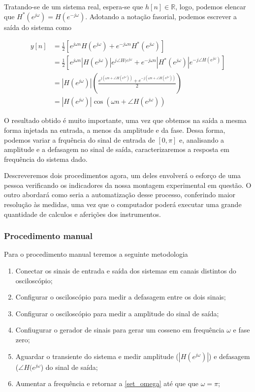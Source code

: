 \documentclass[x11names,a4paper,12pt]{article}
\begin{document}
Tratando-se de um sistema real, espera-se que $h[n] \in \mathbb{R}$, logo, podemos elencar que $H^{*}(e^{j\omega})=H(e^{-j\omega})$. Adotando a notação fasorial, podemos escrever a saída do sistema como

\begin{equation}
  \begin{aligned}
    y[n] & = \frac{1}{2} \left[ e^{j\omega n} H(e^{j\omega}) + e^{-j\omega n} H^*(e^{j\omega}) \right] \\
         & = \frac{1}{2} \left[ e^{j\omega n}|H(e^{j\omega})|e^{j\angle H(e^{j\omega}} + e^{-j\omega n} |H^*(e^{j\omega})|e^{-j\angle H(e^{j\omega})} \right] \\
         & = |H(e^{j\omega})| \left( \frac{e^{j(\omega n + \angle H(e^{j\omega}))} + e^{-j(\omega n + \angle H(e^{j\omega}))}}{2} \right) \\
         & = |H(e^{j\omega})| \cos{(\omega n + \angle H(e^{j\omega}))}
  \end{aligned}
\end{equation}

O resultado obtido é muito importante, uma vez que obtemos na saída a mesma forma injetada na entrada, a menos da amplitude e da fase. Dessa forma, podemos variar a frquência do sinal de entrada de $[0,\pi]$ e, analisando a amplitude e a defasagem no sinal de saída, caracterizaremos a resposta em frequência do sistema dado.

Descreveremos dois procedimentos agora, um deles envolverá o esforço de uma pessoa verificando os indicadores da nossa montagem experimental em questão. O outro abordará como seria a automatização desse processo, conferindo maior resolução às medidas, uma vez que o computador poderá executar uma grande quantidade de calculos e aferições dos instrumentos.

\subsubsection{Procedimento manual}\label{sssec:manual_procedure}

Para o procedimento manual teremos a seguinte metodologia

\begin{enumerate}
  \item Conectar os sinais de entrada e saída dos sistemas em canais distintos do osciloscópio;
  \item Configurar o osciloscópio para medir a defasagem entre os dois sinais;
  \item Configurar o osciloscópio para medir a amplitude do sinal de saída;
  \item Confiugurar o gerador de sinais para gerar um cosseno em frequência $\omega$ e fase zero; \label{set_omega}
  \item Aguardar o transiente do sistema e medir amplitude ($|H(e^{j\omega})|$) e defasagem ($\angle H(e^{j\omega}$) do sinal de saída;
  \item Aumentar a frequência e retornar a \ref{set_omega} até que que $\omega=\pi$;
\end{enumerate}
\end{document}
